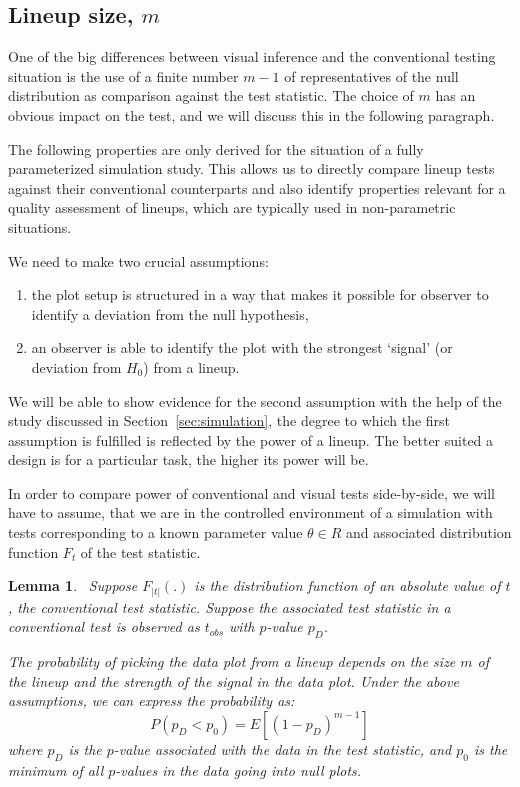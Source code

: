 \documentclass{article}
\newcommand{\red}[1]{{\color{red} #1}}
\newcommand{\hh}[1]{{\color{orange} #1}} %
\newtheorem{lemma}[thm]{Lemma}
\begin{document}

\noindent
\subsection{Lineup size, $m$}

One of the big differences between visual inference and the conventional testing situation is the use of a finite number $m-1$ of representatives of the null distribution as comparison against the test statistic. The choice of $m$ has an obvious impact on the test, and we will discuss this in the following paragraph.

The following properties are only derived for the situation of a  fully parameterized  simulation study. This allows us to directly compare lineup tests against their conventional counterparts and also identify  properties relevant for a quality assessment of  lineups, which are typically used  in non-parametric situations.

We need to make two crucial assumptions:
\begin{enumerate} \itemsep 0in
\item  the plot setup is structured in a way that makes it possible for observer to identify a deviation from the null hypothesis,
\item an observer is able to identify the plot with the strongest `signal' (or deviation from $H_0$)  from a lineup.
\end{enumerate}
We will be able to show evidence for the second assumption with the help of the study discussed in Section~\ref{sec:simulation}, \hh{the degree to which the first assumption is fulfilled is reflected} by the power of a lineup. The better suited a design is for a particular task, the higher its power will be.

\hh{In order to compare power of conventional and visual tests side-by-side, we will have to assume, that we are in the controlled environment of a simulation with tests corresponding to a known parameter value $\theta \in R$ and associated distribution function $F_t$ of the test statistic. }

\begin{lemma}~\label{lemma}
Suppose $F_{|t|}(.)$ is the distribution function of an absolute value of $t$, the conventional test statistic. Suppose the associated test statistic in a conventional test is observed as  $t_{obs}$ with $p$-value $p_D$. 

The probability of picking the data plot from a lineup depends on the size $m$ of the lineup and the strength of the signal in the data plot. 
Under the above assumptions, we can express the probability as:
\[
P(p_D < p_0) =  E\left[ (1 - p_D)^{m-1}\right]
\]
where $p_D$ is the $p$-value associated with the data in the test statistic, and $p_0$ is the minimum of all $p$-values in the data going into null plots.
\end{lemma}
\end{document}
